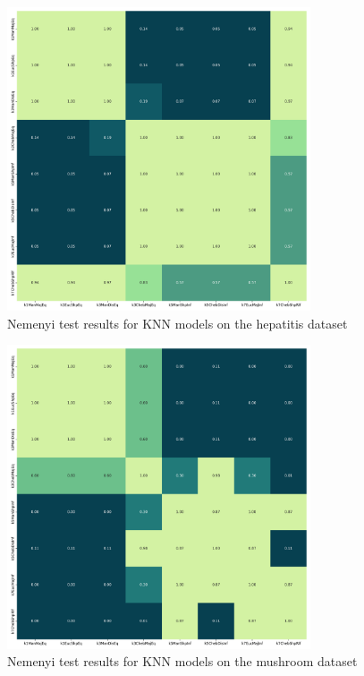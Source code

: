 \begin{figure}[!ht]
    \centering
    \includegraphics[width=0.8\textwidth]{figures/nemenyi_test_results_KNN_hepatitis.png}
    \caption{Nemenyi test results for KNN models on the hepatitis dataset}
\label{fig:nemenyi_test_results_KNN_hepatitis}
\end{figure}

\begin{figure}[!ht]
    \centering
    \includegraphics[width=0.8\textwidth]{figures/nemenyi_test_results_KNN_mushroom.png}
    \caption{Nemenyi test results for KNN models on the mushroom dataset}
\label{fig:nemenyi_test_results_KNN_mushroom}
\end{figure}

